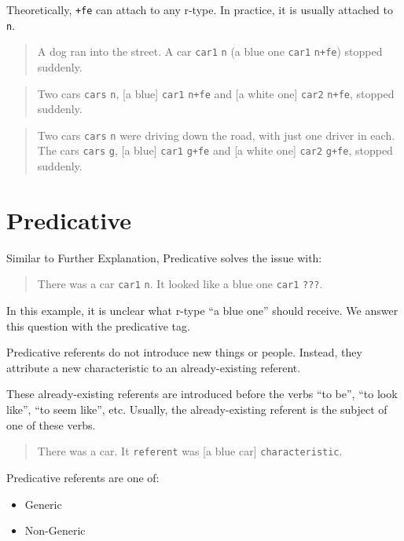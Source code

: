 \documentclass[
]{book}
\providecommand{\tightlist}{%
  \setlength{\itemsep}{0pt}\setlength{\parskip}{0pt}}
\begin{document}
Theoretically, \texttt{+fe} can attach to any r-type. In practice, it is usually attached to \texttt{n}.

\begin{quote}
A dog ran into the street. A car \texttt{car1} \texttt{n} (a blue one \texttt{car1} \texttt{n+fe}) stopped suddenly.
\end{quote}

\begin{quote}
Two cars \texttt{cars} \texttt{n},
{[}a blue{]} \texttt{car1} \texttt{n+fe} and {[}a white one{]} \texttt{car2} \texttt{n+fe},
stopped suddenly.
\end{quote}

\begin{quote}
Two cars \texttt{cars} \texttt{n} were driving down the road,
with just one driver in each.
The cars \texttt{cars} \texttt{g},
{[}a blue{]} \texttt{car1} \texttt{g+fe} and {[}a white one{]} \texttt{car2} \texttt{g+fe},
stopped suddenly.
\end{quote}

\hypertarget{predicative}{%
\section{Predicative}\label{predicative}}

Similar to Further Explanation, Predicative solves the issue with:

\begin{quote}
There was a car \texttt{car1} \texttt{n}. It looked like a blue one \texttt{car1} \texttt{???}.
\end{quote}

In this example, it is unclear what r-type ``a blue one'' should receive.
We answer this question with the predicative tag.

Predicative referents do not introduce new things or people.
Instead,
they attribute a new characteristic to an already-existing referent.

These already-existing referents are introduced
before the verbs ``to be'', ``to look like'', ``to seem like'', etc.
Usually,
the already-existing referent is the subject of one of these verbs.

\begin{quote}
There was a car.
It \texttt{referent} was {[}a blue car{]} \texttt{characteristic}.
\end{quote}

Predicative referents are one of:

\begin{itemize}
\tightlist
\item
  Generic
\item
  Non-Generic
\end{itemize}
\end{document}
